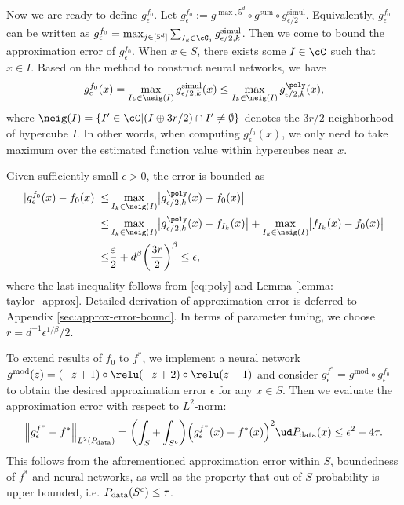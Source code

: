 Now we are ready to define $g^{f_0}_\epsilon$. Let $g^{f_0}_\epsilon:=g^{\max,5^d} \circ g^{\text{sum}} \circ g^{\text{simul}}_{\epsilon/2}$. Equivalently,  $g^{f_0}_\epsilon$ can be written as  $g^{f_0}_\epsilon=\max_{j \in [5^d]} \sum_{I_k \in \cC_j} g^{\text{simul}}_{\epsilon/2,k}$. Then we come to bound the approximation error of $g^{f_0}_\epsilon$. When $x \in S$, there exists some $I \in \cC$ such that $x \in I$.  Based on the method to construct neural networks, we have
\begin{align*}
    g^{f_0}_\epsilon(x) = \max_{I_k \in \neig(I)}  g^{\text{simul}}_{\epsilon/2,k}(x)  \leq\max_{I_k \in \neig(I)}  g^{\poly}_{\epsilon/2,k}(x),
\end{align*}
where $\neig(I)=\{ I' \in \cC | (I \oplus 3r/2)\cap I' \neq \emptyset \}$ denotes the $3r/2$-neighborhood of hypercube $I$.
In other words, when computing $g^{f_0}_\epsilon(x)$, we only need to take maximum over the estimated function value within hypercubes near $x$.

Given sufficiently small $\epsilon > 0$, 
the error is bounded as
\begin{align*}
    | g^{f_0}_\epsilon (x) - f_0(x) | 
    \leq& \max_{I_k \in \neig(I)}  \bigl| g^{\poly}_{\epsilon/2,k}(x)-f_0(x) \bigr| \\
    \leq& \max_{I_k \in \neig(I)}  \bigl| g^{\poly}_{\epsilon/2,k}(x)-f_{I_k}(x) \bigr|+ \max_{I_k \in \neig(I)}  \bigl| f_{I_k}(x) -f_0(x) \bigr| \\
    \leq& \frac{\varepsilon}{2} + d^\beta \biggl(\frac{3r}{2} \biggr)^\beta \leq \epsilon,
\end{align*}
where the last inequality follows from \eqref{eq:poly} and Lemma \ref{lemma: taylor_approx}. Detailed derivation of approximation error is deferred to Appendix \ref{sec:approx-error-bound}. In terms of parameter tuning, we choose $r = d^{-1} \epsilon^{1/\beta}/2$. 

To extend results of $f_0$ to $f^*$, we implement a neural network $g^{\text{mod}}(z)=(-z+1)\circ\relu(-z+2)\circ \relu(z-1)$ and consider $g^{f^*}_\epsilon=g^{\text{mod}}\circ g^{f_0}_\epsilon$ to obtain the desired approximation error $\epsilon$ for any $x\in S$. Then we evaluate the approximation error with respect to $L^2$-norm:
\begin{align*}
    \Bigl\| g^{f^*}_\epsilon-f^* \Bigr\|_{L^2(P_{\rm data})} 
    =\biggl(\int_{S} +\int_{S^c} \biggr) \Bigl(g^{f^*}_\epsilon(x)-f^*(x) \Bigr)^2 \ud P_{\rm data}(x) \leq \epsilon^2 + 4\tau. %
\end{align*}
This follows from the aforementioned approximation error within $S$, boundedness of $f^*$ and neural networks, as well as the property that out-of-$S$ probability is upper bounded, i.e. $P_{\rm data}(S^c) \leq \tau$.

